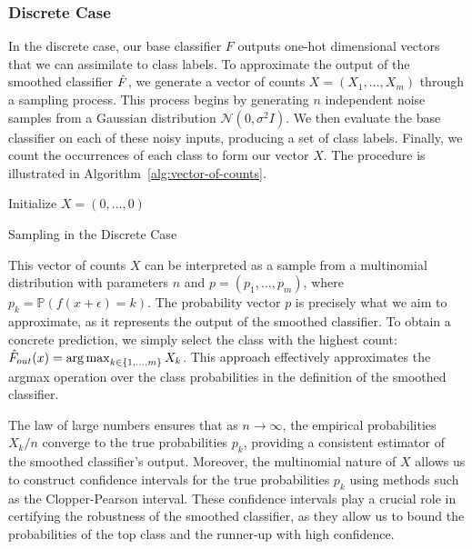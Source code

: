 \subsubsection{Discrete Case}\label{subsubsec:discrete-case-monte-carlo-simulation}
In the discrete case, our base classifier $F$ outputs one-hot dimensional vectors that we can assimilate to class labels.
To approximate the output of the smoothed classifier $\Hat{F}$, we generate a vector of counts $X = (X_1, \ldots, X_m)$ through a sampling process.
This process begins by generating $n$ independent noise samples from a Gaussian distribution $\mathcal{N}(0, \sigma^2 I)$.
We then evaluate the base classifier on each of these noisy inputs, producing a set of class labels.
Finally, we count the occurrences of each class to form our vector $X$.
The procedure is illustrated in Algorithm~\ref{alg:vector-of-counts}.
\begin{algorithm}[htbp]
    \DontPrintSemicolon %
    Initialize $X = (0, \ldots, 0)$\;
    \caption{Sampling in the Discrete Case}\label{alg:vector-of-counts}
\end{algorithm}

This vector of counts $X$ can be interpreted as a sample from a multinomial distribution with parameters $n$ and $p = (p_1, \ldots, p_m)$, where $p_k = \mathbb{P}(f(x + \epsilon) = k)$.
The probability vector $p$ is precisely what we aim to approximate, as it represents the output of the smoothed classifier.
To obtain a concrete prediction, we simply select the class with the highest count: $\hat{F}_{out}(x) = \operatorname*{arg\,max}_{k \in \{1, \ldots, m\}} X_k$.
This approach effectively approximates the argmax operation over the class probabilities in the definition of the smoothed classifier.

The law of large numbers ensures that as $n \rightarrow \infty$, the empirical probabilities $X_k / n$ converge to the true probabilities $p_k$, providing a consistent estimator of the smoothed classifier's output.
Moreover, the multinomial nature of $X$ allows us to construct confidence intervals for the true probabilities $p_k$ using methods such as the Clopper-Pearson interval.
These confidence intervals play a crucial role in certifying the robustness of the smoothed classifier, as they allow us to bound the probabilities of the top class and the runner-up with high confidence.

